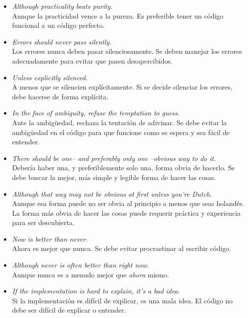 \documentclass[executivepaper]{article}
\begin{document}
\begin{itemize}
    \item \emph{Although practicality beats purity.} \\
    Aunque la practicidad vence a la pureza. Es preferible tener un código funcional a un código perfecto.
    
    \item \emph{Errors should never pass silently.} \\
    Los errores nunca deben pasar silenciosamente. Se deben manejar los errores adecuadamente para evitar que pasen desapercibidos.
    
    \item \emph{Unless explicitly silenced.} \\
    A menos que se silencien explícitamente. Si se decide silenciar los errores, debe hacerse de forma explícita.
    
    \item \emph{In the face of ambiguity, refuse the temptation to guess.} \\
    Ante la ambigüedad, rechaza la tentación de adivinar. Se debe evitar la ambigüedad en el código para que funcione como se espera y sea fácil de entender.
    
    \item \emph{There should be one-- and preferably only one --obvious way to do it.} \\
    Debería haber una, y preferiblemente solo una, forma obvia de hacerlo. Se debe buscar la mejor, más simple y legible forma de hacer las cosas.
    
    \item \emph{Although that way may not be obvious at first unless you're Dutch.} \\
    Aunque esa forma puede no ser obvia al principio a menos que seas holandés. La forma más obvia de hacer las cosas puede requerir práctica y experiencia para ser descubierta.
    
    \item \emph{Now is better than never.} \\
    Ahora es mejor que nunca. Se debe evitar procrastinar al escribir código.
    
    \item \emph{Although never is often better than \emph{right} now.} \\
    Aunque nunca es a menudo mejor que \emph{ahora} mismo.
    
    \item \emph{If the implementation is hard to explain, it's a bad idea.} \\
    Si la implementación es difícil de explicar, es una mala idea. El código no debe ser difícil de explicar o entender.
    

\end{itemize}
\end{document}
